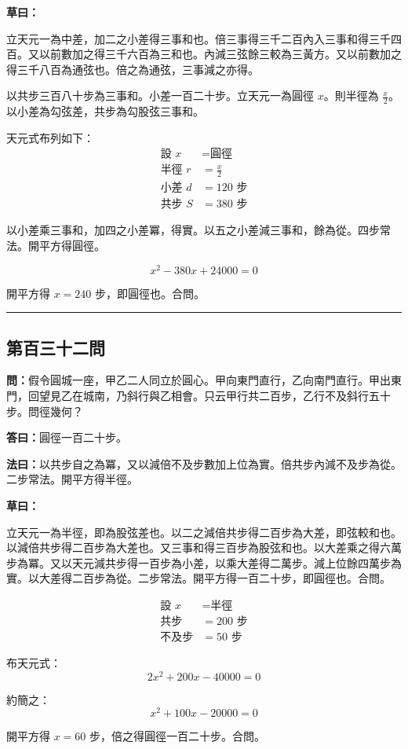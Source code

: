 \documentclass[11pt,a4paper]{article}
\newcommand{\longline}{\noindent\rule{\textwidth}{0.4pt}}
\newcommand{\wen}[1]{\par\noindent\textbf{\textcolor{probcolor}{問：}}{#1}\par}
\newcommand{\da}[1]{\par\noindent\textbf{\textcolor{anscolor}{答曰：}}{#1}\par}
\newcommand{\fayue}[1]{\par\noindent\textbf{\textcolor{methodcolor}{法曰：}}{#1}\par}
\newcommand{\caoyue}[1]{\par\noindent\textbf{草曰：}{#1}\par}
\begin{document}
\caoyue{
立天元一為中差，加二之小差得三事和也。倍三事得三千二百內入三事和得三千四百。又以前數加之得三千六百為三和也。內減三弦餘三較為三黃方。又以前數加之得三千八百為通弦也。倍之為通弦，三事減之亦得。

以共步三百八十步為三事和。小差一百二十步。立天元一為圓徑 $x$。則半徑為 $\frac{x}{2}$。以小差為勾弦差，共步為勾股弦三事和。

天元式布列如下：
\begin{align*}
\text{設 } x &= \text{圓徑} \\
\text{半徑 } r &= \frac{x}{2} \\
\text{小差 } d &= 120 \text{ 步} \\
\text{共步 } S &= 380 \text{ 步}
\end{align*}

以小差乘三事和，加四之小差冪，得實。以五之小差減三事和，餘為從。四步常法。開平方得圓徑。

$$x^2 - 380x + 24000 = 0$$

開平方得 $x = 240$ 步，即圓徑也。合問。
}

\vspace{0.5cm}
\longline

\subsection*{第百三十二問}
\wen{假令圓城一座，甲乙二人同立於圓心。甲向東門直行，乙向南門直行。甲出東門，回望見乙在城南，乃斜行與乙相會。只云甲行共二百步，乙行不及斜行五十步。問徑幾何？}

\da{圓徑一百二十步。}

\fayue{以共步自之為冪，又以減倍不及步數加上位為實。倍共步內減不及步為從。二步常法。開平方得半徑。}

\caoyue{
立天元一為半徑，即為股弦差也。以二之減倍共步得二百步為大差，即弦較和也。以減倍共步得二百步為大差也。又三事和得三百步為股弦和也。以大差乘之得六萬步為冪。又以天元減共步得一百步為小差，以乘大差得二萬步。減上位餘四萬步為實。以大差得二百步為從。二步常法。開平方得一百二十步，即圓徑也。合問。

\begin{align*}
\text{設 } x &= \text{半徑} \\
\text{共步} &= 200 \text{ 步} \\
\text{不及步} &= 50 \text{ 步}
\end{align*}

布天元式：
$$2x^2 + 200x - 40000 = 0$$

約簡之：
$$x^2 + 100x - 20000 = 0$$

開平方得 $x = 60$ 步，倍之得圓徑一百二十步。合問。
}
\end{document}

